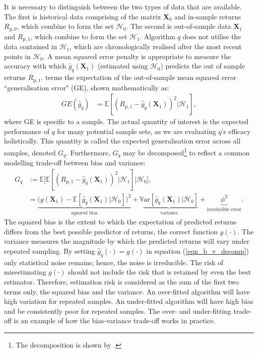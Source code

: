 \documentclass[a4paper,11pt,nocenter,bold,noupper,headcount]{mythesis}
\theoremstyle{plain}
\theoremstyle{definition}
\begin{document}
It is necessary to distinguish between the two types of data that are available. The first is historical data comprising of the matrix $\textbf{X}_0$ and in-sample returns $R_{\mathrm{p}, 0}$, which combine to form the set $\mathcal{H}_0$. The second is out-of-sample data $\textbf{X}_1$ and $R_\mathrm{p, 1}$, which combine to form the set $\mathcal{H}_1$. Algorithm $q$ does not utilise the data contained in $\mathcal{H}_1$, which are chronologically realised after the most recent points in $\mathcal{H}_0$. A mean squared error penalty is appropriate to measure the accuracy with which $\hat{g}_q (\textbf{X}_1)$ (estimated using $\mathcal{H}_0$) predicts the out of sample returns $R_\mathrm{p, 1}$. \cite{K18} terms the expectation of the out-of-sample mean squared error ``generalisation error" (GE), shown mathematically as:
\begin{align}
GE(\hat{g}_q) & = \mathbb{E}[(R_\mathrm{p, 1} - \hat{g}_q (\textbf{X}_1))^2|{\mathcal{H}_1}],
\end{align}
where GE is specific to a sample. The actual quantity of interest is the expected performance of $q$ for many potential sample sets, as we are evaluating $q$'s efficacy holistically. This quantity is called the expected generalisation error across all samples, denoted $G_q$. Furthermore, $G_q$ may be decomposed\footnote{The decomposition is shown by \cite{FHT01}.} to reflect a common modelling trade-off between bias and variance:
\begin{align}
G_q &:= \mathbb{E} \Big [ \mathbb{E}[(R_\mathrm{p, 1} - \hat{g}_q (\textbf{X}_1))^2|{\mathcal{H}_1}] \Big | \mathcal{H}_0\Big ] , \\
& = \underbrace{ \Big (g(\textbf{X}_1) - \mathbb{E}[\hat{g}_q (\textbf{X}_1)|\mathcal{H}_0] \Big )^2}_{\text{squared bias}} + \underbrace{\mathbb{V}\mathrm{ar} [\hat{g}_q(\textbf{X}_1)|\mathcal{H}_0]}_{\text{variance}} + \underbrace{\phi^2}_{\text{irreducible error}}.\label{eqn_b_v_decomp}
\end{align}
The squared bias is the extent to which the expectation of predicted returns differs from the best possible predictor of returns, the correct function $g(\cdot)$. The variance measures the magnitude by which the predicted returns will vary under repeated sampling. By setting $\hat{g}_q(\cdot) = g(\cdot)$ in equation (\ref{eqn_b_v_decomp}) only statistical noise remains; hence, the noise is irreducible. The risk of misestimating $g(\cdot)$ should not include the risk that is retained by even the best estimator. Therefore, estimation risk is considered as the sum of the first two terms only, the squared bias and the variance. An over-fitted algorithm will have high variation for repeated samples. An under-fitted algorithm will have high bias and be consistently poor for repeated samples. The over- and under-fitting trade-off is an example of how the bias-variance trade-off works in practice.
\end{document}
